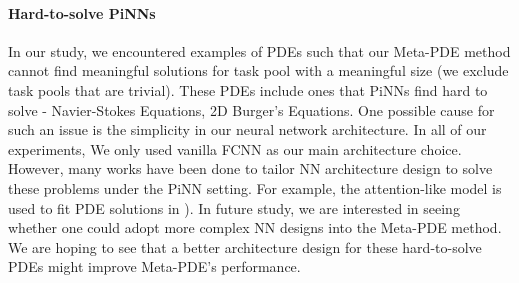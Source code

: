 \paragraph{Hard-to-solve PiNNs}  
In our study, we encountered examples of PDEs such that our Meta-PDE method cannot find meaningful solutions for task pool with a meaningful size (we exclude task pools that are trivial). These PDEs include ones that PiNNs find hard to solve - Navier-Stokes Equations, 2D Burger's Equations. One possible cause for such an issue is the simplicity in our neural network architecture. In all of our experiments, We only used vanilla FCNN as our main architecture choice. However, many works have been done to tailor NN architecture design to solve these problems under the PiNN setting. For example, the attention-like model is used to fit PDE solutions in \citet{wang2020understanding}). In future study, we are interested in seeing whether one could adopt more complex NN designs into the Meta-PDE method. We are hoping to see that a better architecture design for these hard-to-solve PDEs might improve Meta-PDE's performance.